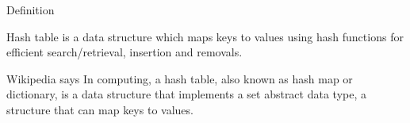 \begin{frame}{Definition}
    \begin{block}{}
      \centering
      Hash table is a data structure which maps keys to values using hash functions for efficient search/retrieval, insertion and removals.  
    \end{block}
    
    \begin{block}{Wikipedia says}
        \centering
        In computing, a hash table, also known as hash map or dictionary, is a data structure that implements a set abstract data type, a structure that can map keys to values.  
    \end{block}  
\end{frame}
